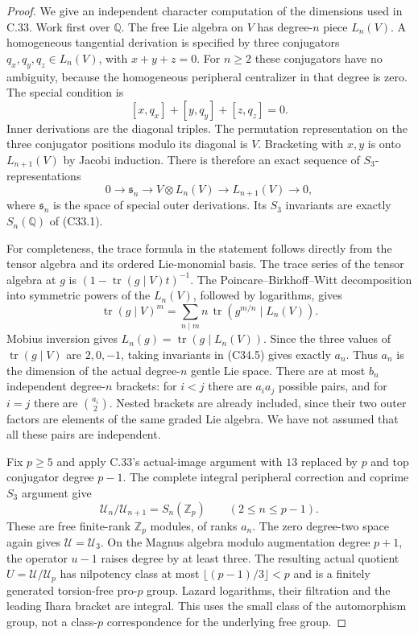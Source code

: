 \begin{proof}
We give an independent character computation of the dimensions
used in C.33.  Work first over $\mathbb Q$.
The free Lie algebra on $V$ has degree-$n$ piece $L_n(V)$.
A homogeneous tangential derivation is specified by three
conjugators $q_x,q_y,q_z\in L_n(V)$, with $x+y+z=0$.
For $n\geq2$ these conjugators have no ambiguity, because
the homogeneous peripheral centralizer in that degree is zero.
The special condition is
\[
            [x,q_x]+[y,q_y]+[z,q_z]=0 .
\]
Inner derivations are the diagonal triples.  The permutation
representation on the three conjugator positions modulo its
diagonal is $V$.  Bracketing with $x,y$ is onto $L_{n+1}(V)$
by Jacobi induction.  There is therefore an exact sequence
of $S_3$-representations
\[
 0\longrightarrow \mathfrak s_n
 \longrightarrow V\otimes L_n(V)
 \longrightarrow L_{n+1}(V)\longrightarrow0,                    \tag{C34.5}
\]
where $\mathfrak s_n$ is the space of special outer derivations.
Its $S_3$ invariants are exactly $S_n(\mathbb Q)$ of (C33.1).

For completeness, the trace formula in the statement follows
directly from the tensor algebra and its ordered Lie-monomial
basis.  The trace series of the tensor algebra at $g$ is
$(1-\operatorname{tr}(g\mid V)t)^{-1}$.
The Poincare--Birkhoff--Witt decomposition into symmetric
powers of the $L_n(V)$, followed by logarithms, gives
\[
 \operatorname{tr}(g\mid V)^m
       =\sum_{n\mid m}n\,\operatorname{tr}(g^{m/n}\mid L_n(V)).
\]
Mobius inversion gives $L_n(g)=\operatorname{tr}(g\mid L_n(V))$.
Since the three values of $\operatorname{tr}(g\mid V)$ are
$2,0,-1$, taking invariants in (C34.5) gives exactly $a_n$.
Thus $a_n$ is the dimension of the actual degree-$n$
gentle Lie space.
There are at most $b_n$ independent degree-$n$ brackets:
for $i<j$ there are $a_i a_j$ possible pairs, and for $i=j$
there are $\binom{a_i}{2}$.  Nested brackets are already
included, since their two outer factors are elements of
the same graded Lie algebra.  We have not assumed that
all these pairs are independent.

Fix $p\geq5$ and apply C.33's actual-image argument with
$13$ replaced by $p$ and top conjugator degree $p-1$.
The complete integral peripheral correction and coprime
$S_3$ argument give
\[
       \mathcal U_n/\mathcal U_{n+1}=S_n(\mathbb Z_p)
              \qquad(2\leq n\leq p-1).                          \tag{C34.6}
\]
These are free finite-rank $\mathbb Z_p$ modules, of ranks $a_n$.
The zero degree-two space again gives $\mathcal U=\mathcal U_3$.
On the Magnus algebra modulo augmentation degree $p+1$,
the operator $u-1$ raises degree by at least three.
The resulting actual quotient
$U=\mathcal U/\mathcal U_p$ has nilpotency class at most
$\lfloor(p-1)/3\rfloor<p$ and is a finitely generated
torsion-free pro-$p$ group.  Lazard logarithms, their
filtration and the leading Ihara bracket are integral.
This uses the small class of the automorphism group,
not a class-$p$ correspondence for the underlying free group.


\end{proof}
